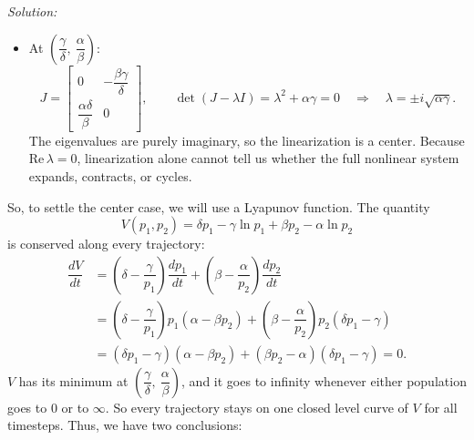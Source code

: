 \documentclass{article}
\newenvironment{solution}
    {\noindent \textit{Solution:}\vspace{1em}\\}
    {\newpage}
\newcommand{\pl}{\left(}
\newcommand{\pr}{\right)}
\begin{document}
\begin{solution}
\begin{enumerate}
\begin{enumerate}
\begin{itemize}
\begin{equation*}
                \qquad \lambda_1 = \alpha > 0, \quad \lambda_2 = -\gamma < 0.
            \end{equation*}
            One eigenvalue is positive and one is negative, so the origin is an unstable saddle point. 
            Along the $p_1$ axis, prey alone grow like $e^{\alpha t}$. Along the $p_2$ axis, predators alone die
            like $e^{-\gamma t}$. A trajectory that starts with both populations positive can never reaches the
            origin.
            \item At $\pl \dfrac{\gamma}{\delta},\ \dfrac{\alpha}{\beta} \pr$:
            \begin{equation*}
                J = \begin{bmatrix} 0 & -\dfrac{\beta\gamma}{\delta} \\[4pt] \dfrac{\alpha\delta}{\beta} & 0 \end{bmatrix},
                \qquad \det\pl J - \lambda I \pr = \lambda^2 + \alpha\gamma = 0
                \quad \Rightarrow \quad \lambda = \pm i\sqrt{\alpha\gamma}.
            \end{equation*}
            The eigenvalues are purely imaginary, so the linearization is a center. Because
            $\mathrm{Re}\,\lambda = 0$, linearization alone cannot tell us whether the full nonlinear system expands, contracts, or cycles. 
        \end{itemize}
        So, to settle the center case, we will use a Lyapunov function. The quantity
        \begin{equation*}
            V\pl p_1, p_2 \pr = \delta p_1 - \gamma \ln p_1 + \beta p_2 - \alpha \ln p_2
        \end{equation*}
        is conserved along every trajectory:
        \begin{align*}
            \dfrac{dV}{dt} &= \pl \delta - \dfrac{\gamma}{p_1} \pr \dfrac{dp_1}{dt} + \pl \beta - \dfrac{\alpha}{p_2} \pr \dfrac{dp_2}{dt} \\
            &= \pl \delta - \dfrac{\gamma}{p_1} \pr p_1 \pl \alpha - \beta p_2 \pr + \pl \beta - \dfrac{\alpha}{p_2} \pr p_2 \pl \delta p_1 - \gamma \pr \\
            &= \pl \delta p_1 - \gamma \pr \pl \alpha - \beta p_2 \pr + \pl \beta p_2 - \alpha \pr \pl \delta p_1 - \gamma \pr = 0.
        \end{align*}
        $V$ has its minimum at $\pl \dfrac{\gamma}{\delta},\ \dfrac{\alpha}{\beta} \pr$, and it goes to infinity whenever either
        population goes to $0$ or to $\infty$. So every trajectory stays on one closed level curve of $V$ for all timesteps. Thus, we have two conclusions:

\end{enumerate}
\end{enumerate}
\end{solution}
\end{document}
